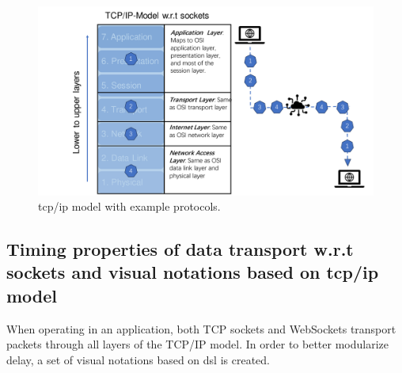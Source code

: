 \begin{figure}[htb]
    \centering
    \includegraphics[width=\textwidth]{figures/methodology/TCP_IP.pdf}
    \caption{\gls{tcp/ip} model with example protocols. \label{fig: TCP_IP}}
\end{figure}

\subsection{Timing properties of data transport w.r.t sockets and visual notations based on \gls{tcp/ip} model}
When operating in an application, both TCP sockets and WebSockets transport packets 
through all layers of the TCP/IP model. In order to better modularize delay, a set of 
visual notations based on \gls{dsl} is created.



